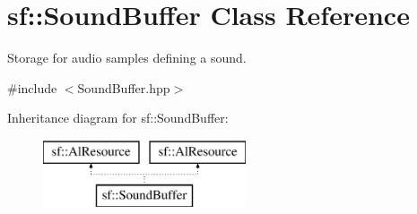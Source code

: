 \hypertarget{classsf_1_1_sound_buffer}{\section{sf\-:\-:Sound\-Buffer Class Reference}
\label{classsf_1_1_sound_buffer}
}


Storage for audio samples defining a sound.  




{\ttfamily \#include $<$Sound\-Buffer.\-hpp$>$}

Inheritance diagram for sf\-:\-:Sound\-Buffer\-:\begin{figure}[H]
\begin{center}
\leavevmode
\includegraphics[height=2.000000cm]{classsf_1_1_sound_buffer}
\end{center}
\end{figure}
